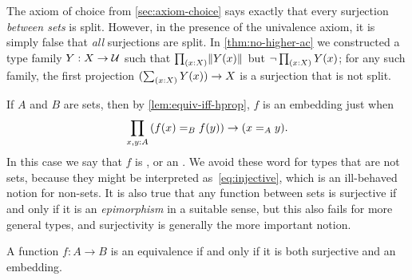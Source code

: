 \documentclass[hott-all.tex]{subfiles}
\begin{document}
The axiom of choice from \cref{sec:axiom-choice} says exactly that every surjection \emph{between sets} is split.
However, in the presence of the univalence axiom, it is simply false that \emph{all} surjections are split.
In \cref{thm:no-higher-ac} we constructed a type family $Y:X\to \mathcal{U}$ such that $\prd{x:X} \brck{Y(x)}$ but $\neg \prd{x:X} Y(x)$;
for any such family, the first projection $(\sm{x:X} Y(x)) \to X$ is a surjection that is not split.

If $A$ and $B$ are sets, then by \cref{lem:equiv-iff-hprop}, $f$ is an embedding just when
\begin{equation}
  \prd{x,y:A} (\id[B]{f(x)}{f(y)}) \to (\id[A]xy).\label{eq:injective}
\end{equation}
In this case we say that $f$ is ,
%
%
or an .
%
We avoid these word for types that are not sets, because they might be interpreted as~\eqref{eq:injective}, which is an ill-behaved notion for non-sets.
It is also true that any function between sets is surjective if and only if it is an \emph{epimorphism} in a suitable sense, but this also fails for more general types, and surjectivity is generally the more important notion.

\begin{thm}\label{thm:mono-surj-equiv}
  A function $f:A\to B$ is an equivalence if and only if it is both surjective and an embedding.
\end{thm}
%
\end{document}

